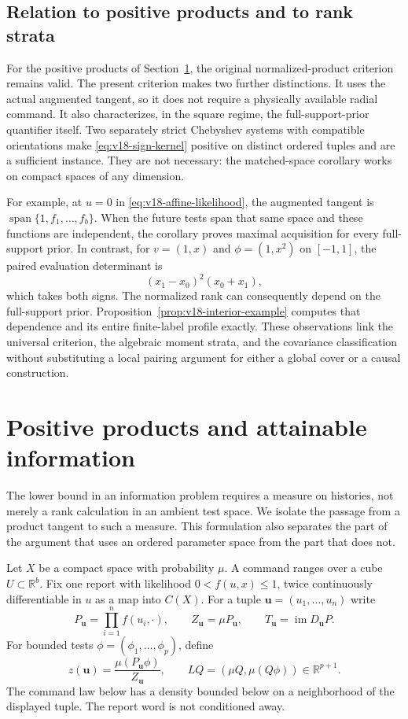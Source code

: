 \documentclass[11pt]{amsart}
\theoremstyle{definition}\newtheorem{definition}[theorem]{Definition}
\theoremstyle{remark}\newtheorem{remark}[theorem]{Remark}
\newcommand{\R}{\mathbb R}\newcommand{\N}{\mathbb N}\newcommand{\C}{\mathbb C}
\begin{document}
\subsection{Relation to positive products and to rank strata}
For the positive products of Section~\ref{sec:positive-history}, the
original normalized-product criterion remains valid. The present
criterion makes two further distinctions. It uses the actual augmented
tangent, so it does not require a physically available radial command.
It also characterizes, in the square regime, the full-support-prior
quantifier itself. Two separately strict Chebyshev systems with compatible
orientations make \eqref{eq:v18-sign-kernel} positive on distinct ordered
tuples and are a sufficient instance. They are not necessary: the
matched-space corollary works on compact spaces of any dimension.

For example, at $u=0$ in \eqref{eq:v18-affine-likelihood}, the augmented
tangent is $\operatorname{span}\{1,f_1,\ldots,f_b\}$. When the future
tests span that same space and these functions are independent, the
corollary proves maximal acquisition for every full-support prior.
In contrast, for $v=(1,x)$ and $\phi=(1,x^2)$ on $[-1,1]$, the paired
evaluation determinant is
\[
 (x_1-x_0)^2(x_0+x_1),
\]
which takes both signs. The normalized rank can consequently depend on
the full-support prior. Proposition~\ref{prop:v18-interior-example}
computes that dependence and its entire finite-label profile exactly.
These observations link the universal criterion, the algebraic moment
strata, and the covariance classification without substituting a local
pairing argument for either a global cover or a causal construction.

\section{Positive products and attainable information}
\label{sec:positive-history}
The lower bound in an information problem requires a measure on histories,
not merely a rank calculation in an ambient test space. We isolate the
passage from a product tangent to such a measure. This formulation also
separates the part of the argument that uses an ordered parameter space
from the part that does not.

Let $X$ be a compact space with probability $\mu$. A command ranges over
a cube $U\subset\R^b$. Fix one report with likelihood $0<f(u,x)\le1$, twice
continuously differentiable in $u$ as a map into $C(X)$. For a tuple
$\boldsymbol u=(u_1,\ldots,u_n)$ write
\[
 P_{\boldsymbol u}=\prod_{i=1}^nf(u_i,\cdot),\qquad
 Z_{\boldsymbol u}=\mu P_{\boldsymbol u},\qquad
 T_{\boldsymbol u}=\operatorname{im}D_{\boldsymbol u}P.
\]
For bounded tests $\phi=(\phi_1,\ldots,\phi_p)$, define
\[
 z(\boldsymbol u)=\frac{\mu(P_{\boldsymbol u}\phi)}{Z_{\boldsymbol u}},
 \qquad LQ=(\mu Q,\mu(Q\phi))\in\R^{p+1}.
\]
The command law below has a density bounded below on a neighborhood of
the displayed tuple. The report word is not conditioned away.
\end{document}
